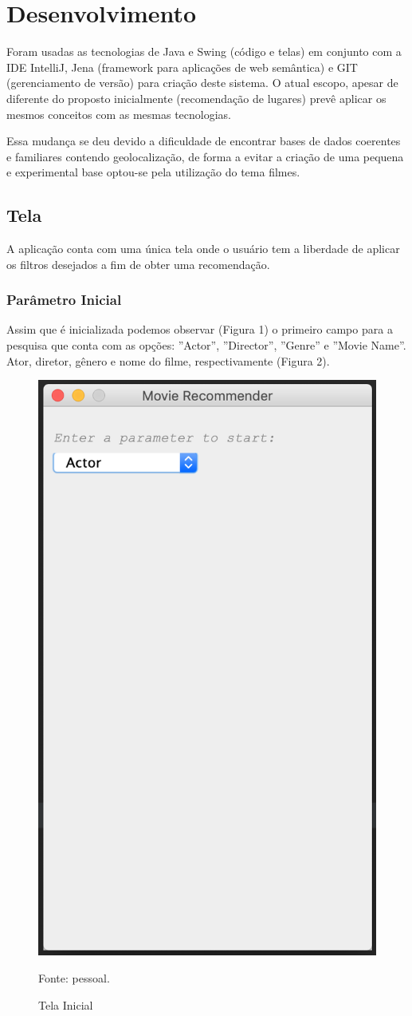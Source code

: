 \chapter{Desenvolvimento}\label{cap_intro}

 Foram usadas as tecnologias de Java e Swing (código e telas) em conjunto com a IDE IntelliJ, Jena (framework para aplicações de web semântica) e GIT (gerenciamento de versão) para criação deste sistema. O atual escopo, apesar de diferente do proposto inicialmente (recomendação de lugares) prevê aplicar os mesmos conceitos com as mesmas tecnologias.

Essa mudança se deu devido a dificuldade de encontrar bases de dados coerentes e familiares contendo geolocalização, de forma a evitar a criação de uma pequena e experimental base optou-se pela utilização do tema filmes.

\section{Tela}

 A aplicação conta com uma única tela onde o usuário tem a liberdade de aplicar os filtros desejados a fim de obter uma recomendação.
 
 \subsection{Parâmetro Inicial} 
 
 Assim que é inicializada podemos observar (Figura 1) o primeiro campo para a pesquisa que conta com as opções: ''Actor'', ''Director'', ''Genre'' e ''Movie Name''. Ator, diretor, gênero e nome do filme, respectivamente (Figura 2).
 
 \begin{figure}[H]
 	\centering
 	\includegraphics[width=0.5\linewidth]{images/telaInicial1}
 	\caption{Tela Inicial}
 	Fonte: pessoal.
 	\label{fig:Tela Inicial}
 \end{figure}
 
